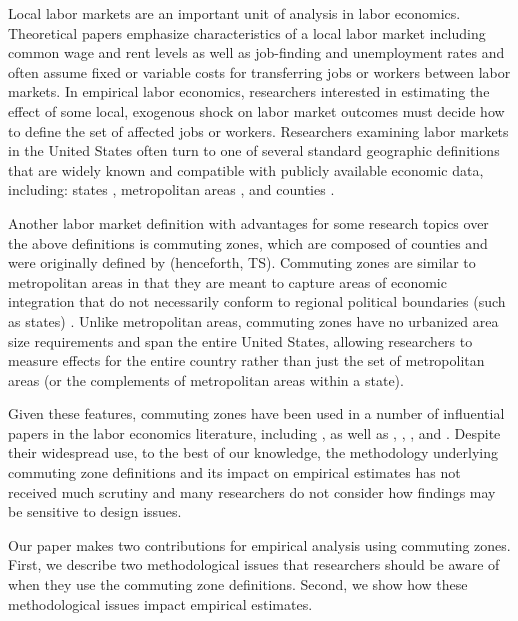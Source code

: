Local labor markets are an important unit of analysis in labor economics. Theoretical papers emphasize characteristics of a local labor market including common wage and rent levels \citep{Roback1982,Moretti2011} as well as job-finding and unemployment rates \citep{HL2012,SS2014} and often assume fixed or variable costs for transferring jobs or workers between labor markets. In empirical labor economics, researchers interested in estimating the effect of some local, exogenous shock on labor market outcomes must decide how to define the set of affected jobs or workers. Researchers examining labor markets in the United States often turn to one of several standard geographic definitions that are widely known and compatible with publicly available economic data, including: states \citep{BK1992,Wozniak2010,KW2011}, metropolitan areas \citep{BH2000,Card2001,Notowidigdo2011,Diamond2016}, and counties \citep{MRR2015,FGS2015}.

Another labor market definition with advantages for some research topics over the above definitions is commuting zones, which are composed of counties and were originally defined by \citet{TS1996} (henceforth, TS). Commuting zones are similar to metropolitan areas in that they are meant to capture areas of economic integration that do not necessarily conform to regional political boundaries (such as states) \citep{FR2000,FR2010}. Unlike metropolitan areas, commuting zones have no urbanized area size requirements and span the entire United States, allowing researchers to measure effects for the entire country rather than just the set of metropolitan areas (or the complements of metropolitan areas within a state). 

Given these features, commuting zones have been used in a number of influential papers in the labor economics literature, including \citet{ADH2013}, as well as \citet{ChettyHendrenKlineSaez2014}, \citet{AM2015}, \citet{Restrepo2015}, and \citet{Yagan2016}. Despite their widespread use, to the best of our knowledge, the methodology underlying commuting zone definitions and its impact on empirical estimates has not received much scrutiny and many researchers do not consider how findings may be sensitive to design issues. 

Our paper makes two contributions for empirical analysis using commuting zones. First, we describe two methodological issues that researchers should be aware of when they use the commuting zone definitions. Second, we show how these methodological issues impact empirical estimates. 

